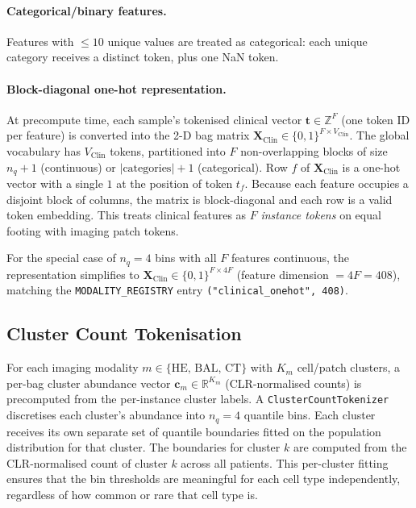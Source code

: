 \documentclass[11pt,a4paper]{article}
\begin{document}
\paragraph{Categorical/binary features.}
Features with $\leq 10$ unique values are treated as categorical: each unique
category receives a distinct token, plus one NaN token.

\paragraph{Block-diagonal one-hot representation.}
At precompute time, each sample's tokenised clinical vector $\mathbf{t} \in
\mathbb{Z}^F$ (one token ID per feature) is converted into the 2-D bag matrix
$\mathbf{X}_\text{Clin} \in \{0,1\}^{F \times V_\text{Clin}}$.
The global vocabulary has $V_\text{Clin}$ tokens, partitioned into $F$
non-overlapping blocks of size $n_q + 1$ (continuous) or
$|\text{categories}| + 1$ (categorical).
Row $f$ of $\mathbf{X}_\text{Clin}$ is a one-hot vector with a single $1$ at
the position of token $t_f$.
Because each feature occupies a disjoint block of columns, the matrix is
block-diagonal and each row is a valid token embedding.
This treats clinical features as $F$ \emph{instance tokens} on equal footing
with imaging patch tokens.

For the special case of $n_q = 4$ bins with all $F$ features continuous, the
representation simplifies to $\mathbf{X}_\text{Clin} \in \{0,1\}^{F \times 4F}$
(feature dimension $= 4F = 408$), matching the \texttt{MODALITY\_REGISTRY}
entry \texttt{("clinical\_onehot", 408)}.

\subsection{Cluster Count Tokenisation}

For each imaging modality $m \in \{\text{HE, BAL, CT}\}$ with $K_m$
cell/patch clusters, a per-bag cluster abundance vector
$\mathbf{c}_m \in \mathbb{R}^{K_m}$ (CLR-normalised counts) is precomputed
from the per-instance cluster labels.
A \texttt{ClusterCountTokenizer} discretises each cluster's abundance into
$n_q = 4$ quantile bins.
Each cluster receives its own separate set of quantile boundaries fitted on the
population distribution for that cluster.
The boundaries for cluster $k$ are computed from the CLR-normalised count of
cluster $k$ across all patients.
This per-cluster fitting ensures that the bin thresholds are meaningful for
each cell type independently, regardless of how common or rare that cell type
is.
\end{document}
